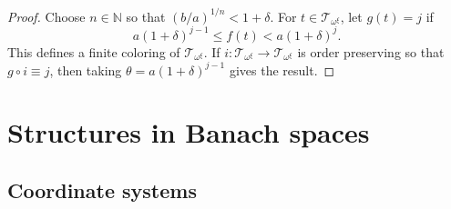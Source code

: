 \documentclass[12pt]{amsart}
\theoremstyle{definition}
\newcommand{\nn}{\mathbb{N}}
\newcommand{\ttt}{\mathcal{T}}
\begin{document}
\begin{proof} Choose $n\in \nn$ so that $(b/a)^{1/n}<1+\delta$.  For $t\in \ttt_{\omega^\xi}$, let $g(t)=j$ if $$a(1+\delta)^{j-1} \leqslant f(t)< a(1+\delta)^j.$$  This defines a finite coloring of $\ttt_{\omega^\xi}$.  If $i:\ttt_{\omega^\xi}\to \ttt_{\omega^\xi}$ is order preserving so that $g\circ i\equiv j$, then taking $\theta= a(1+\delta)^{j-1}$ gives the result.  


\end{proof}















































































\section{Structures in Banach spaces}

\subsection{Coordinate systems}
\end{document}
